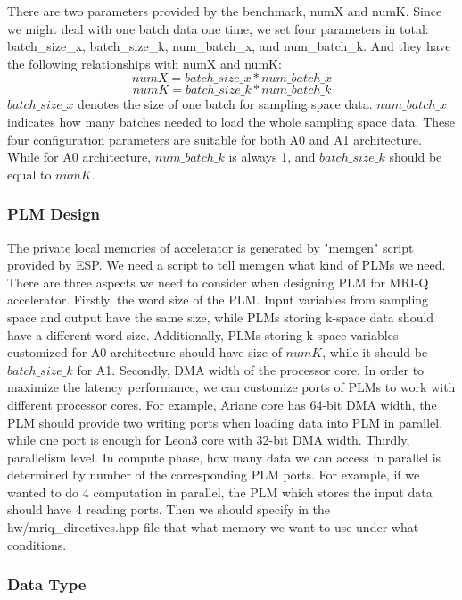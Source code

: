 \documentclass{sig-alternate}
\begin{document}
There are two parameters provided by the benchmark, numX and numK. Since we might deal with one batch data one time, we set four parameters in total: batch\_size\_x, batch\_size\_k, num\_batch\_x, and num\_batch\_k. And they have the following relationships with numX and numK:
    $$numX = batch\_size\_x * num\_batch\_x$$
    $$numK = batch\_size\_k * num\_batch\_k$$
$batch\_size\_x$ denotes the size of one batch for sampling space data. $num\_batch\_x$ indicates how many batches needed to load the whole sampling space data. These four configuration parameters are suitable for both A0 and A1 architecture. While for A0 architecture, $num\_batch\_k$ is always 1, and $batch\_size\_k$ should be equal to $numK$.\\

\subsubsection{PLM Design}
The private local memories of accelerator is generated by "memgen" script provided by ESP. We need a script to tell memgen what kind of PLMs we need. There are three aspects we need to consider when designing PLM for MRI-Q accelerator. Firstly, the word size of the PLM. Input variables from sampling space and output have the same size, while PLMs storing k-space data should have a different word size. Additionally, PLMs storing k-space variables customized for A0 architecture should have size of $numK$, while it should be $batch\_size\_k$ for A1. Secondly, DMA width of the processor core. In order to maximize the latency performance, we can customize ports of PLMs to work with different processor cores. For example, Ariane core has 64-bit DMA width, the PLM should provide two writing ports when loading data into PLM in parallel. while one port is enough for Leon3 core with 32-bit DMA width. Thirdly, parallelism level. In compute phase, how many data we can access in parallel is determined by number of the corresponding PLM ports. For example, if we wanted to do 4 computation in parallel, the PLM which stores the input data should have 4 reading ports. Then we should specify in the hw/mriq\_directives.hpp file that what memory we want to use under what conditions. 


\subsubsection{Data Type}
\end{document}
